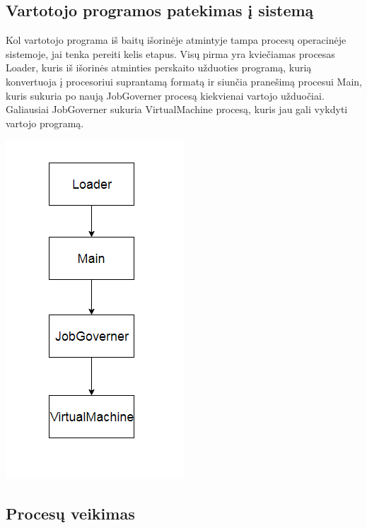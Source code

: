 \documentclass{scrartcl}
\begin{document}
      \subsection{Vartotojo programos patekimas į sistemą}
        Kol vartotojo programa iš baitų išorinėje atmintyje tampa procesų operacinėje sistemoje, jai tenka pereiti kelis etapus. Visų pirma yra kviečiamas procesas Loader, kuris iš išorinės atminties perskaito užduoties programą, kurią konvertuoja į procesoriui suprantamą formatą ir siunčia pranešimą procesui Main, kuris sukuria po naują JobGoverner procesą kiekvienai vartojo užduočiai. Galiausiai JobGoverner sukuria VirtualMachine procesą, kuris jau gali vykdyti vartojo programą.
        \begin{center}
          \includegraphics[scale=1]{Program_load}
        \end{center}

      \subsection{Procesų veikimas}
\end{document}
